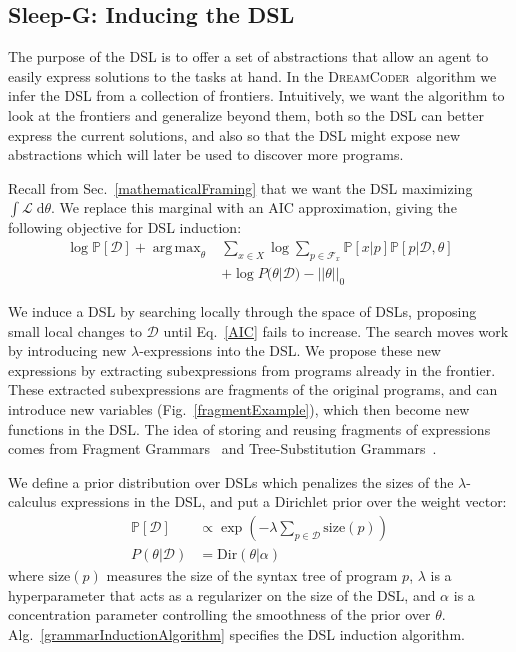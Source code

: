 \documentclass{article}
\newcommand{\system}{\textsc{DreamCoder}~}
\newcommand{\lowerBound}{\mathscr{L}}
\DeclareMathOperator*{\argmax}{arg\,max} %
\newcommand{\probability}{\mathds{P}} %
\begin{document}
\subsection{Sleep-G: Inducing the DSL}\label{grammarInductionSection}

The purpose of the DSL is to
offer a set of abstractions
that allow an agent to easily express solutions to the tasks at hand.
In the \system algorithm we infer the DSL from a collection of frontiers.
Intuitively, we want the algorithm to
look at  the frontiers and
generalize beyond them, 
both so the DSL can better express the current solutions,
and  also so that the DSL might expose new abstractions
which will later be used to
discover more programs.

Recall from Sec.~\ref{mathematicalFraming} that we want the DSL maximizing $\int \lowerBound\;\mathrm{d}\theta$.
We replace this marginal with an AIC approximation, giving the following objective for DSL induction:
\begin{align}
\nonumber  \log \probability[\mathcal{D}] + \argmax_{\theta}& \sum_{x\in X}\log \sum_{p\in \mathcal{F}_x}\probability[x|p]\probability[p|\mathcal{D},\theta]\\
&+  \log P(\theta|\mathcal{D}) - ||\theta||_0 \label{AIC}
  \end{align}

We induce a DSL by searching locally through the space of DSLs,
proposing small local changes to $\mathcal{D}$ until Eq.~\ref{AIC} fails to increase.
The search moves work by introducing new
$\lambda$-expressions into the DSL.
We propose these new expressions by extracting subexpressions from
programs already in the frontier.
These extracted subexpressions
are fragments of the original programs, and can introduce new variables (Fig.~\ref{fragmentExample}),
which then become new functions in the DSL.
The idea of storing and reusing
fragments of expressions comes from Fragment Grammars~\cite{tim} and Tree-Substitution Grammars~\cite{cohn2010inducing}.



We define a prior distribution over DSLs which penalizes the sizes of the $\lambda$-calculus expressions in the DSL, and put a Dirichlet prior over the weight vector:
\begin{align*}
  \probability[\mathcal{D}]&\propto\exp\left(-\lambda\sum_{p\in \mathcal{D}}\text{size}(p) \right)\\
  P(\theta|\mathcal{D})& = \text{Dir}(\theta|\alpha)
\end{align*}
where $\text{size}(p)$  measures the size of the syntax tree of program $p$,
$\lambda$ is a hyperparameter that acts as a regularizer on the size of the DSL,
and $\alpha$ is a concentration parameter controlling the smoothness of the prior over $\theta$.
Alg.~\ref{grammarInductionAlgorithm} specifies the DSL induction algorithm.
\end{document}
